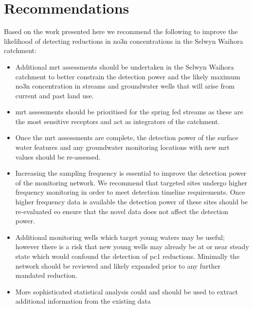 \section[Recommendations]{Recommendations} \label{sec:recommendations}

Based on the work presented here we recommend the following to improve the likelihood of detecting reductions in \gls{no3n} concentrations in the Selwyn Waihora catchment:
\begin{itemize}
    \item Additional \gls{mrt} assessments should be undertaken in the Selwyn Waihora catchment to better constrain the detection power and the likely maximum \gls{no3n} concentration in streams and groundwater wells that will arise from current and past land use.
    \item \gls{mrt} assessments should be prioritised for the spring fed streams as these are the most sensitive receptors and act as integrators of the catchment.
    \item Once the \gls{mrt} assessments are complete, the detection power of the surface water features and any groundwater monitoring locations with new \gls{mrt} values should be re-assessed.
    \item Increasing the sampling frequency is essential to improve the detection power of the monitoring network. We recommend that targeted sites undergo higher frequency monitoring in order to meet detection timeline requirements. Once higher frequency data is available the detection power of these sites should be re-evaluated eo ensure that the novel data does not affect the detection power.
    \item Additional monitoring wells which target young waters may be useful; however there is a risk that new young wells may already be at or near steady state which would confound the detection of \gls{pc1} reductions. Minimally the network should be reviewed and likely expanded prior to any further mandated reduction.
    \item More sophisticated statistical analysis could and should be used to extract additional information from the existing data
\end{itemize}